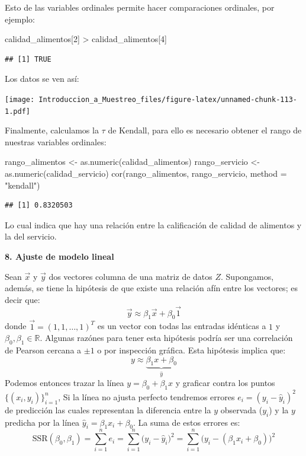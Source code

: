 \documentclass[
]{book}
\newenvironment{Shaded}{\begin{snugshade}}{\end{snugshade}}
\newcommand{\AttributeTok}[1]{\textcolor[rgb]{0.77,0.63,0.00}{#1}}
\newcommand{\DecValTok}[1]{\textcolor[rgb]{0.00,0.00,0.81}{#1}}
\newcommand{\FunctionTok}[1]{\textcolor[rgb]{0.00,0.00,0.00}{#1}}
\newcommand{\NormalTok}[1]{#1}
\newcommand{\OtherTok}[1]{\textcolor[rgb]{0.56,0.35,0.01}{#1}}
\newcommand{\SpecialCharTok}[1]{\textcolor[rgb]{0.00,0.00,0.00}{#1}}
\newcommand{\StringTok}[1]{\textcolor[rgb]{0.31,0.60,0.02}{#1}}
\begin{document}
Esto de las variables ordinales permite hacer comparaciones ordinales, por ejemplo:

\begin{Shaded}
\begin{Highlighting}[]
\NormalTok{calidad\_alimentos[}\DecValTok{2}\NormalTok{] }\SpecialCharTok{\textgreater{}}\NormalTok{ calidad\_alimentos[}\DecValTok{4}\NormalTok{]}
\end{Highlighting}
\end{Shaded}

\begin{verbatim}
## [1] TRUE
\end{verbatim}

Los datos se ven así:

\texttt{[image: Introduccion\_a\_Muestreo\_files/figure-latex/unnamed-chunk-113-1.pdf]}

Finalmente, calculamos la \(\tau\) de Kendall, para ello es necesario obtener el rango de nuestras variables ordinales:

\begin{Shaded}
\begin{Highlighting}[]
\NormalTok{rango\_alimentos }\OtherTok{\textless{}{-}} \FunctionTok{as.numeric}\NormalTok{(calidad\_alimentos)}
\NormalTok{rango\_servicio  }\OtherTok{\textless{}{-}} \FunctionTok{as.numeric}\NormalTok{(calidad\_servicio)}
\FunctionTok{cor}\NormalTok{(rango\_alimentos, rango\_servicio, }\AttributeTok{method =} \StringTok{"kendall"}\NormalTok{)}
\end{Highlighting}
\end{Shaded}

\begin{verbatim}
## [1] 0.8320503
\end{verbatim}

Lo cual indica que hay una relación entre la calificación de calidad de alimentos y la del servicio.

\textbf{8. Ajuste de modelo lineal}

Sean \(\vec{x}\) y \(\vec{y}\) dos vectores columna de una matriz de datos \(Z\). Supongamos, además, se tiene la hipótesis de que existe una relación afín entre los vectores; es decir que:
\[
\vec{y} \approx \beta_1 \vec{x} + \beta_0 \vec{1} 
\]
donde \(\vec{1} = (1, 1, \dots, 1)^T\) es un vector con todas las entradas idénticas a \(1\) y \(\beta_0, \beta_1 \in \mathbb{R}\). Algunas razónes para tener esta hipótesis podría ser una correlación de Pearson cercana a \(\pm 1\) o por inspección gráfica. Esta hipótesis implica que:
\[
y \approx \underbrace{\beta_1 x + \beta_0}_{\hat{y}}
\]
Podemos entonces trazar la línea \(y = \beta_0 + \beta_1 x\) y graficar contra los puntos \(\{(x_i,y_i)\}_{i=1}^{n}\), Si la línea no ajusta perfecto tendremos errores \(e_i = (y_i - \hat{y}_i)^2\) de predicción las cuales representan la diferencia entre la \(y\) observada (\(y_i\)) y la \(y\) predicha por la línea \(\hat{y}_i = \beta_1 x_i + \beta_0\). La suma de estos errores es:
\[
\textrm{SSR}(\beta_0, \beta_1) = \sum\limits_{i=1}^{n} e_i = \sum\limits_{i=1}^{n} \big( y_i - \hat{y}_i \big)^2 = \sum\limits_{i=1}^{n} \big( y_i - (\beta_1 x_i + \beta_0) \big)^2 
\]
\end{document}
